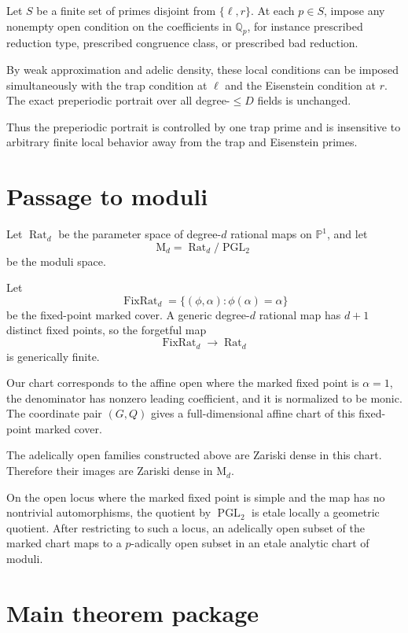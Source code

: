 \documentclass[11pt]{article}
\begin{document}
Let \(S\) be a finite set of primes disjoint from \(\{\ell,r\}\). At each \(p\in S\), impose any nonempty open condition on the coefficients in \(\mathbb Q_p\), for instance prescribed reduction type, prescribed congruence class, or prescribed bad reduction.

By weak approximation and adelic density, these local conditions can be imposed simultaneously with the trap condition at \(\ell\) and the Eisenstein condition at \(r\). The exact preperiodic portrait over all degree-\(\le D\) fields is unchanged.

Thus the preperiodic portrait is controlled by one trap prime and is insensitive to arbitrary finite local behavior away from the trap and Eisenstein primes.

\section{Passage to moduli}

Let \(\operatorname{Rat}_d\) be the parameter space of degree-\(d\) rational maps on \(\mathbb P^1\), and let
\[
\mathrm M_d=\operatorname{Rat}_d/\operatorname{PGL}_2
\]
be the moduli space.

Let
\[
\operatorname{FixRat}_d
=
\{(\phi,\alpha):\phi(\alpha)=\alpha\}
\]
be the fixed-point marked cover. A generic degree-\(d\) rational map has \(d+1\) distinct fixed points, so the forgetful map
\[
\operatorname{FixRat}_d\to \operatorname{Rat}_d
\]
is generically finite.

Our chart corresponds to the affine open where the marked fixed point is \(\alpha=1\), the denominator has nonzero leading coefficient, and it is normalized to be monic. The coordinate pair \((G,Q)\) gives a full-dimensional affine chart of this fixed-point marked cover.

The adelically open families constructed above are Zariski dense in this chart. Therefore their images are Zariski dense in \(\mathrm M_d\).

On the open locus where the marked fixed point is simple and the map has no nontrivial automorphisms, the quotient by \(\operatorname{PGL}_2\) is etale locally a geometric quotient. After restricting to such a locus, an adelically open subset of the marked chart maps to a \(p\)-adically open subset in an etale analytic chart of moduli.

\section{Main theorem package}
\end{document}

